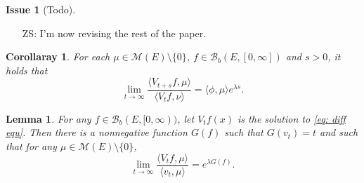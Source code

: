 \documentclass[12pt,a4paper]{amsart}
\numberwithin{equation}{section}
\theoremstyle{plain}
\newtheorem{lem}[thm]{Lemma}
\newtheorem{cor}[thm]{Corollaray}
\theoremstyle{definition}
\newtheorem{iss}{Issue}
\begin{document}
\begin{iss}[Todo]
  \begin{itemize}
  \item[ZS:]
I'm now revising the rest of the paper.
  \end{itemize}
\end{iss}

\begin{cor}\label{cor:general_rate}
	For each $\mu\in\mathcal M(E)\setminus\{0\}$, $f\in\mathcal B_b(E,[0,\infty])$ and $s>0$, it holds that
  \begin{equation}\label{eq:ratio_limits}
\lim_{t\rightarrow\infty}\frac{\langle V_{t+s}f,\mu\rangle }{\langle V_{t}f,\nu\rangle }
=\langle \phi,\mu\rangle e^{\lambda s}.
  \end{equation}
\end{cor}

\begin{lem}\label{eq:ratio_limits_2}
	For any $f\in\mathcal B_b(E,[0,\infty))$, let $V_tf(x)$ is the solution to \eqref{eq: diff equ}.  Then there is a nonnegative function $G(f)$ such that $G(v_t)=t$ and such that for any $\mu\in\mathcal M(E)\setminus\{0\}$,
  \begin{equation}\label{eq:app_of_G}
    \lim_{t\rightarrow\infty}\frac{\langle V_tf,\mu\rangle }{\langle v_t,\mu\rangle }=e^{\lambda G(f)}.
  \end{equation}
\end{lem}
\end{document}
